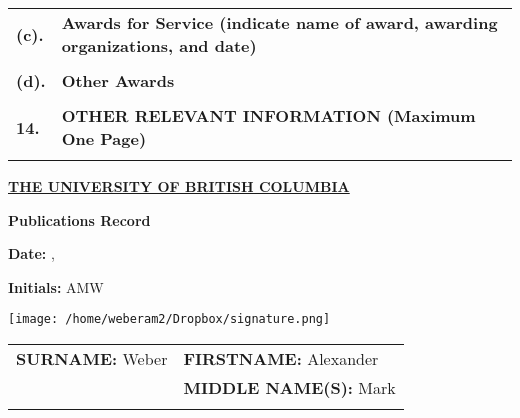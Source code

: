 \documentclass[11pt,notitlepage,english]{report}
\makeatletter
\newcommand{\monthyeardate}{%
  \DTMenglishmonthname{\@dtm@month}, \@dtm@year
}
\makeatother
\begin{document}
\begin{tabular}{L{.5cm} L{18.9cm} }
  \\
  \textbf{(c).}  & \textbf{Awards for Service (indicate name of award, awarding organizations, and date)}                                      \\
  \\
  \textbf{(d).}  & \textbf{Other Awards}                                      \\
  \\
  \textbf{14.}  & \textbf{OTHER RELEVANT INFORMATION (Maximum One Page)}                                      \\
  \\
\end{tabular}

\pagebreak

\begin{center}
  \underline{\textbf{THE UNIVERSITY OF BRITISH COLUMBIA}}
  \vspace{10pt}

  \textbf{Publications Record}
\end{center}

\noindent %
\begin{minipage}[t]{0.33\textwidth}
  \raggedright
  \textbf{Date:} \monthyeardate
\end{minipage}%
\begin{minipage}[t]{0.33\textwidth}
  \begin{center}
    \textbf{Initials:} AMW \hspace{10pt} 
  \end{center}
\end{minipage}%
\begin{minipage}[t]{0.33\textwidth}
  \raggedleft
  \texttt{[image: /home/weberam2/Dropbox/signature.png]}
\end{minipage}


\vspace{15pt}


\begin{tabular}{L{8cm} L{6.9cm}}
  \textbf{SURNAME:} Weber                       & \textbf{FIRSTNAME:} Alexander      \\
                                                & \textbf{MIDDLE NAME(S):} Mark      \\
                                                \\
\end{tabular}
\end{document}
